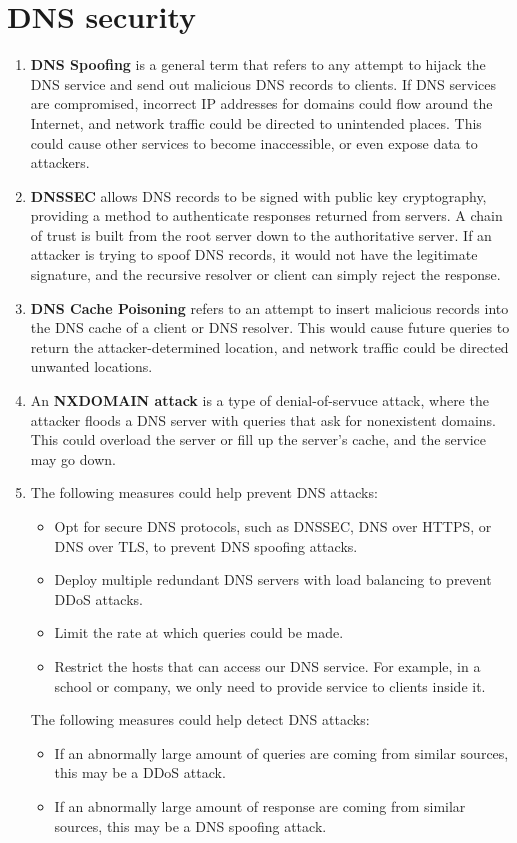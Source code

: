 \documentclass[12pt, a4paper]{article}
\begin{document}
  \section{DNS security}
  \begin{enumerate}[label=(\alph*)]
    \item \textbf{DNS Spoofing} is a general term that refers to any attempt
    to hijack the DNS service and send out malicious DNS records to clients.
    If DNS services are compromised, incorrect IP addresses for domains
    could flow around the Internet, and network traffic could be directed to
    unintended places. This could cause other services to become inaccessible,
    or even expose data to attackers.
    \item \textbf{DNSSEC} allows DNS records to be signed with public key
    cryptography, providing a method to authenticate responses returned from
    servers. A chain of trust is built from the root server down to the
    authoritative server. If an attacker is trying to spoof DNS records,
    it would not have the legitimate signature, and the recursive resolver
    or client can simply reject the response.
    \item \textbf{DNS Cache Poisoning} refers to an attempt to insert
    malicious records into the DNS cache of a client or DNS resolver.
    This would cause future queries to return the attacker-determined
    location, and network traffic could be directed unwanted locations.
    \item An \textbf{NXDOMAIN attack} is a type of denial-of-servuce attack, where
    the attacker floods a DNS server with queries that ask for nonexistent domains.
    This could  overload the server or fill up the server's cache, and the service
    may go down.
    \item The following measures could help prevent DNS attacks:
    \begin{itemize}
      \item Opt for secure DNS protocols, such as DNSSEC, DNS over HTTPS,
      or DNS over TLS, to prevent DNS spoofing attacks.
      \item Deploy multiple redundant DNS servers with load balancing to prevent
      DDoS attacks.
      \item Limit the rate at which queries could be made.
      \item Restrict the hosts that can access our DNS service. For example,
      in a school or company, we only need to provide service to clients
      inside it.
    \end{itemize}

    The following measures could help detect DNS attacks:
    \begin{itemize}
      \item If an abnormally large amount of queries are coming from similar
      sources, this may be a DDoS attack.
      \item If an abnormally large amount of response are coming from similar
      sources, this may be a DNS spoofing attack.
    \end{itemize}
  \end{enumerate}
\end{document}
